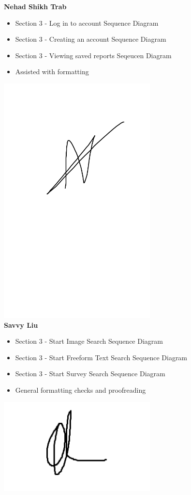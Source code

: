 \documentclass[]{article}
\numberwithin{figure}{section}
\begin{document}
\textbf{Nehad Shikh Trab}
\begin{itemize}
    \setlength\itemindent{2em}
    \item Section 3 - Log in to account Sequence Diagram
    \item Section 3 - Creating an account Sequence Diagram
    \item Section 3 - Viewing saved reports Seqeucen Diagram
    \item Assisted with formatting
\end{itemize}
\includegraphics[width=0.6\textwidth]{Nehad.png}
\\
\textbf{Savvy Liu}
\begin{itemize}
    \setlength\itemindent{2em}
    \item Section 3 - Start Image Search Sequence Diagram
    \item Section 3 - Start Freeform Text Search Sequence Diagram
    \item Section 3 - Start Survey Search Sequence Diagram
    \item General formatting checks and proofreading
\end{itemize} 
\includegraphics[width=0.6\textwidth]{Savvy.png}
\end{document}
